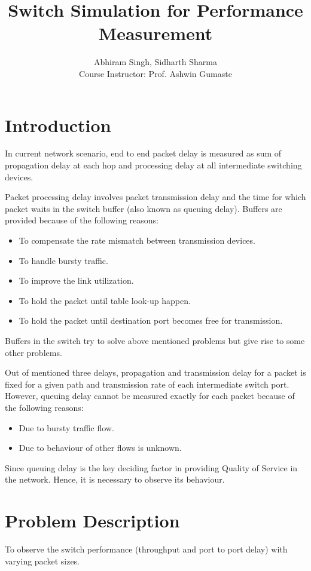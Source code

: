\documentclass[twocolumn,10pt]{article}
\date{}
\begin{document}
\title{\textbf{Switch Simulation for Performance Measurement}}
\author{Abhiram Singh, Sidharth Sharma\\Course Instructor: Prof. Ashwin Gumaste}
\maketitle
\thispagestyle{fancy}
\section{Introduction}
In current network scenario, end to end packet delay is measured as sum of propagation delay at each hop and processing delay at all intermediate switching devices.

Packet processing delay involves packet transmission delay and the time for which packet waits in the switch buffer (also known as queuing delay).
Buffers are provided because of the following reasons:
\begin{itemize}
\item To compensate the rate mismatch between transmission devices.
\item To handle bursty traffic.
\item To improve the link utilization.
\item To hold the packet until table look-up happen.
\item To hold the packet until destination port becomes free for transmission.
\end{itemize}
Buffers in the switch try to solve above mentioned problems but give rise to some other problems.

Out of mentioned three delays, propagation and transmission delay for a packet is fixed for a given path and transmission rate of each intermediate switch port.
However, queuing delay cannot be measured exactly for each packet because of the following reasons:
\begin{itemize}
\item Due to bursty traffic flow.
\item Due to behaviour of other flows is unknown.
\end{itemize}
Since queuing delay is the key deciding factor in providing Quality of Service in the network. Hence, it is necessary to observe its behaviour.

\section{Problem Description}
To observe the switch performance (throughput and port to port delay) with varying packet sizes. 
\end{document}
